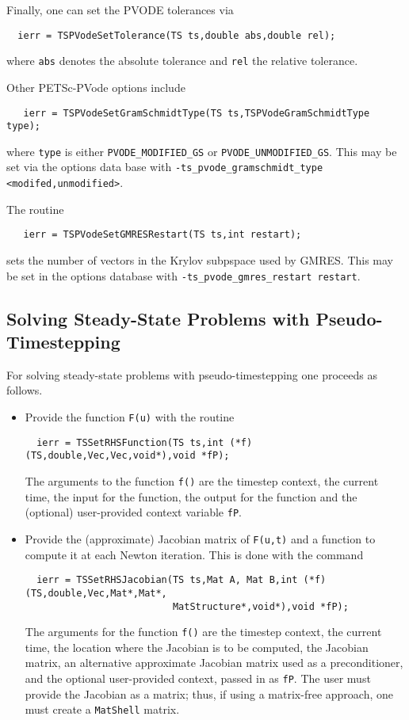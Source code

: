 Finally, one can set the PVODE tolerances via
\begin{verbatim}
  ierr = TSPVodeSetTolerance(TS ts,double abs,double rel);
\end{verbatim}
where {\tt abs} denotes the absolute tolerance and {\tt rel}
the relative tolerance. 

Other PETSc-PVode options include
\begin{verbatim}
   ierr = TSPVodeSetGramSchmidtType(TS ts,TSPVodeGramSchmidtType type);
\end{verbatim}
where {\tt type} is either {\tt PVODE\_MODIFIED\_GS} or 
{\tt PVODE\_UNMODIFIED\_GS}. 
 
 This may be set via the options data base
with {\tt -ts\_pvode\_gramschmidt\_type <modifed,unmodified>}.

The routine 
\begin{verbatim}
   ierr = TSPVodeSetGMRESRestart(TS ts,int restart);
\end{verbatim}
sets the number of vectors in the Krylov subpspace used by GMRES.
 This may be set in the options 
database with {\tt -ts\_pvode\_gmres\_restart restart}. 


\subsection{Solving Steady-State Problems with Pseudo-Timestepping}

For solving steady-state problems with pseudo-timestepping one proceeds 
as follows.
\begin{itemize}
\item Provide the function {\tt F(u)} with the routine
\begin{verbatim}
  ierr = TSSetRHSFunction(TS ts,int (*f)(TS,double,Vec,Vec,void*),void *fP);
\end{verbatim}
The  arguments to the function {\tt f()} are
the timestep context, the current time, the input for the function,
the output for the function and the (optional) user-provided context
variable {\tt fP}.

\item Provide the (approximate) Jacobian matrix of {\tt F(u,t)} and a 
function to compute it at each Newton iteration. This is done with the command
\begin{verbatim}
  ierr = TSSetRHSJacobian(TS ts,Mat A, Mat B,int (*f)(TS,double,Vec,Mat*,Mat*,
                          MatStructure*,void*),void *fP);
\end{verbatim}
The  arguments for the function {\tt f()} are
the timestep context, the current time, the location where the
Jacobian is to be computed, the Jacobian matrix, an alternative
approximate Jacobian matrix used as a preconditioner, and the optional
user-provided context, passed in as {\tt fP}. The user must provide the 
Jacobian as a matrix; thus, if using a matrix-free approach, one 
must create a {\tt MatShell} matrix.
\end{itemize}

